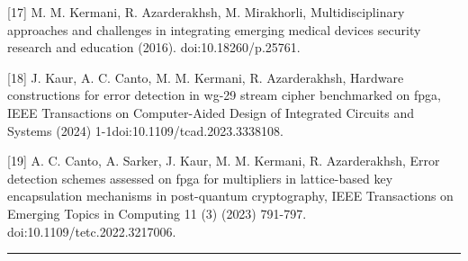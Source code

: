 [17] M. M. Kermani, R. Azarderakhsh, M. Mirakhorli, Multidisciplinary approaches and challenges in integrating emerging medical devices security research and education (2016). \linebreak doi:10.18260/p.25761.


[18] J. Kaur, A. C. Canto, M. M. Kermani, R. Azarderakhsh, Hardware constructions for error detection in wg-29 stream cipher benchmarked on fpga, IEEE Transactions on Computer-Aided Design of Integrated Circuits and Systems (2024) 1-1doi:10.1109/tcad.2023.3338108.

[19] A. C. Canto, A. Sarker, J. Kaur, M. M. Kermani, R. Azarderakhsh, Error detection schemes assessed on fpga for multipliers in lattice-based key encapsulation mechanisms in post-quantum cryptography, IEEE Transactions on Emerging Topics in Computing 11 (3) (2023) 791-797. doi:10.1109/tetc.2022.3217006.


\color{black}


\noindent\rule{\linewidth}{6.0pt}